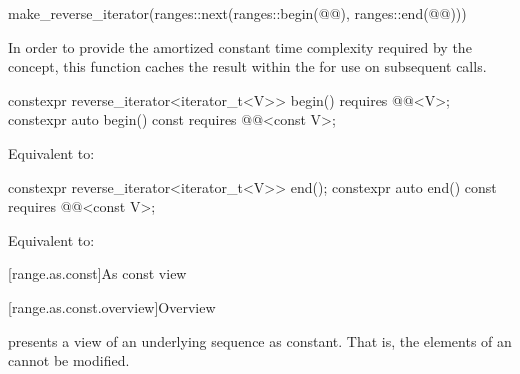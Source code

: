\begin{itemdescr}
\pnum
\returns
\begin{codeblock}
make_reverse_iterator(ranges::next(ranges::begin(@@), ranges::end(@@)))
\end{codeblock}

\pnum
\remarks
In order to provide the amortized constant time complexity required by
the  concept, this function caches the result within the
 for use on subsequent calls.
\end{itemdescr}

%
\begin{itemdecl}
constexpr reverse_iterator<iterator_t<V>> begin() requires @@<V>;
constexpr auto begin() const requires @@<const V>;
\end{itemdecl}

\begin{itemdescr}
\pnum
\effects
Equivalent to: 
\end{itemdescr}

%
\begin{itemdecl}
constexpr reverse_iterator<iterator_t<V>> end();
constexpr auto end() const requires @@<const V>;
\end{itemdecl}

\begin{itemdescr}
\pnum
\effects
Equivalent to: 
\end{itemdescr}

[range.as.const]{As const view}

[range.as.const.overview]{Overview}

\pnum
{} presents a view of an underlying sequence as constant.
That is, the elements of an  cannot be modified.

